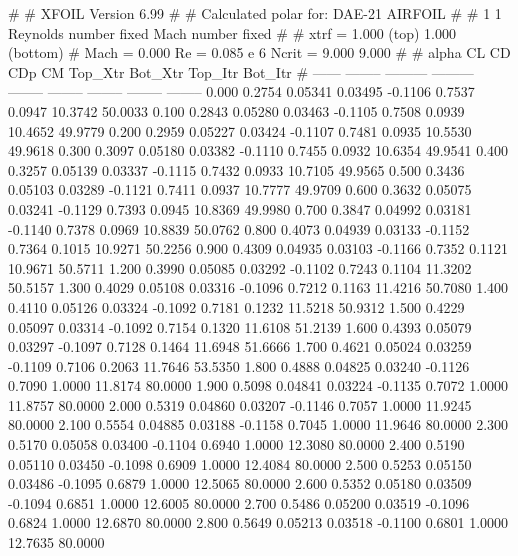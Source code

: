 #  
#       XFOIL         Version 6.99
#  
# Calculated polar for: DAE-21 AIRFOIL                                  
#  
# 1 1 Reynolds number fixed          Mach number fixed         
#  
# xtrf =   1.000 (top)        1.000 (bottom)  
# Mach =   0.000     Re =     0.085 e 6     Ncrit =   9.000  9.000
#  
#   alpha    CL        CD       CDp       CM     Top_Xtr  Bot_Xtr  Top_Itr  Bot_Itr
#  ------ -------- --------- --------- -------- -------- -------- -------- --------
   0.000   0.2754   0.05341   0.03495  -0.1106   0.7537   0.0947  10.3742  50.0033
   0.100   0.2843   0.05280   0.03463  -0.1105   0.7508   0.0939  10.4652  49.9779
   0.200   0.2959   0.05227   0.03424  -0.1107   0.7481   0.0935  10.5530  49.9618
   0.300   0.3097   0.05180   0.03382  -0.1110   0.7455   0.0932  10.6354  49.9541
   0.400   0.3257   0.05139   0.03337  -0.1115   0.7432   0.0933  10.7105  49.9565
   0.500   0.3436   0.05103   0.03289  -0.1121   0.7411   0.0937  10.7777  49.9709
   0.600   0.3632   0.05075   0.03241  -0.1129   0.7393   0.0945  10.8369  49.9980
   0.700   0.3847   0.04992   0.03181  -0.1140   0.7378   0.0969  10.8839  50.0762
   0.800   0.4073   0.04939   0.03133  -0.1152   0.7364   0.1015  10.9271  50.2256
   0.900   0.4309   0.04935   0.03103  -0.1166   0.7352   0.1121  10.9671  50.5711
   1.200   0.3990   0.05085   0.03292  -0.1102   0.7243   0.1104  11.3202  50.5157
   1.300   0.4029   0.05108   0.03316  -0.1096   0.7212   0.1163  11.4216  50.7080
   1.400   0.4110   0.05126   0.03324  -0.1092   0.7181   0.1232  11.5218  50.9312
   1.500   0.4229   0.05097   0.03314  -0.1092   0.7154   0.1320  11.6108  51.2139
   1.600   0.4393   0.05079   0.03297  -0.1097   0.7128   0.1464  11.6948  51.6666
   1.700   0.4621   0.05024   0.03259  -0.1109   0.7106   0.2063  11.7646  53.5350
   1.800   0.4888   0.04825   0.03240  -0.1126   0.7090   1.0000  11.8174  80.0000
   1.900   0.5098   0.04841   0.03224  -0.1135   0.7072   1.0000  11.8757  80.0000
   2.000   0.5319   0.04860   0.03207  -0.1146   0.7057   1.0000  11.9245  80.0000
   2.100   0.5554   0.04885   0.03188  -0.1158   0.7045   1.0000  11.9646  80.0000
   2.300   0.5170   0.05058   0.03400  -0.1104   0.6940   1.0000  12.3080  80.0000
   2.400   0.5190   0.05110   0.03450  -0.1098   0.6909   1.0000  12.4084  80.0000
   2.500   0.5253   0.05150   0.03486  -0.1095   0.6879   1.0000  12.5065  80.0000
   2.600   0.5352   0.05180   0.03509  -0.1094   0.6851   1.0000  12.6005  80.0000
   2.700   0.5486   0.05200   0.03519  -0.1096   0.6824   1.0000  12.6870  80.0000
   2.800   0.5649   0.05213   0.03518  -0.1100   0.6801   1.0000  12.7635  80.0000
